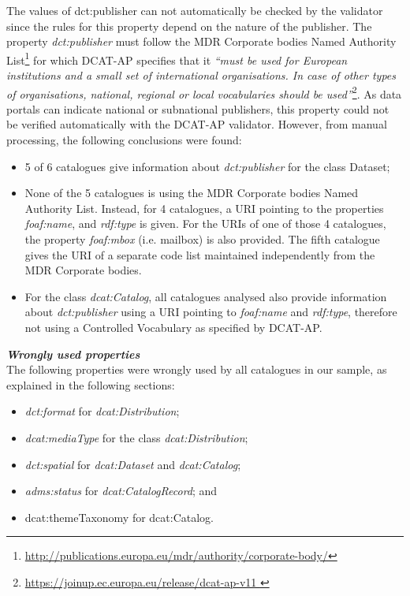 \documentclass[<options>]{elsarticle}
\begin{document}
The values of dct:publisher can not automatically be checked by the validator since the rules for this property depend on the nature of the publisher. The property \textit{dct:publisher} must follow the MDR Corporate bodies Named Authority List\footnote{\href{      http://publications.europa.eu/mdr/authority/corporate-body/}{http://publications.europa.eu/mdr/authority/corporate-body/}} for which DCAT-AP specifies that it \textit{“must be used for European institutions and a small set of international organisations. In case of other types of organisations, national, regional or local vocabularies should be used”}\footnote{\href{https://joinup.ec.europa.eu/release/dcat-ap-v11}{    https://joinup.ec.europa.eu/release/dcat-ap-v11 }}. As data portals can indicate national or subnational publishers, this property could not be verified automatically with the DCAT-AP validator. However, from manual processing, the following conclusions were found:

\begin{itemize}
\item 5 of 6 catalogues give information about \textit{dct:publisher} for the class Dataset;
\item None of the 5 catalogues is using the MDR Corporate bodies Named Authority List. Instead, for 4 catalogues, a URI pointing to the properties \textit{foaf:name}, and \textit{rdf:type} is given. For the URIs of one of those 4 catalogues, the property \textit{foaf:mbox} (i.e. mailbox) is also provided. The fifth catalogue gives the URI of a separate code list maintained independently from the MDR Corporate bodies.
\item For the class \textit{dcat:Catalog}, all catalogues analysed also provide information about \textit{dct:publisher} using a URI pointing to \textit{foaf:name} and \textit{rdf:type}, therefore not using a Controlled Vocabulary as specified by DCAT-AP.
\end{itemize}

\textbf{\textit{Wrongly used properties}}\\
The following properties were wrongly used by all catalogues in our sample, as explained in the following sections: 
\begin{itemize}
\item \textit{dct:format} for \textit{dcat:Distribution};
\item \textit{dcat:mediaType} for the class \textit{dcat:Distribution}; 
\item \textit{dct:spatial} for \textit{dcat:Dataset} and \textit{dcat:Catalog}; 
\item \textit{adms:status} for \textit{dcat:CatalogRecord}; and 
\item dcat:themeTaxonomy for dcat:Catalog.
\end{itemize}
\end{document}
